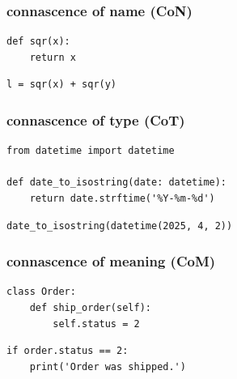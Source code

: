 \documentclass[aspectratio=169,12pt,xcolor=dvipsnames]{beamer}
\begin{document}
\begin{frame}[fragile]
  \frametitle{connascence of name (CoN)}
  \begin{center}
    \begin{minipage}[c]{.35\textwidth}
      \begin{verbatim}
def sqr(x):
    return x
      \end{verbatim}
    \end{minipage}
    \begin{minipage}[c]{.35\textwidth}
      \begin{verbatim}
l = sqr(x) + sqr(y)
      \end{verbatim}
    \end{minipage}
  \end{center}
\end{frame}

\begin{frame}[fragile]
  \frametitle{connascence of type (CoT)}
  \begin{center}
    \begin{minipage}[c]{.65\textwidth}
      \begin{verbatim}
from datetime import datetime

def date_to_isostring(date: datetime):
    return date.strftime('%Y-%m-%d')
      \end{verbatim}
    \end{minipage}
    \begin{minipage}[c]{.65\textwidth}
      \begin{verbatim}
date_to_isostring(datetime(2025, 4, 2))
      \end{verbatim}
    \end{minipage}
  \end{center}
\end{frame}

\begin{frame}[fragile]
  \frametitle{connascence of meaning (CoM)}
  \begin{center}
    \begin{minipage}[c]{.5\textwidth}
      \begin{verbatim}
class Order:
    def ship_order(self):
        self.status = 2
      \end{verbatim}
    \end{minipage}
    \begin{minipage}[c]{.5\textwidth}
      \begin{verbatim}
if order.status == 2:
    print('Order was shipped.')
      \end{verbatim}
    \end{minipage}
  \end{center}
\end{frame}
\end{document}
